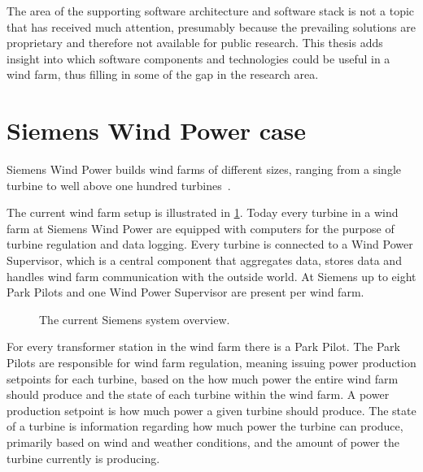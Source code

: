 The area of the supporting software architecture and software stack is not a topic that has received much attention, presumably because the prevailing solutions are proprietary and therefore not available for public research.
This thesis adds insight into which software components and technologies could be useful in a wind farm, thus filling in some of the gap in the research area.

\section{Siemens Wind Power case}


\label{sec:SiemensCase}
Siemens Wind Power builds wind farms of different sizes, ranging from a single turbine to well above one hundred turbines~\cite{simensOffShoreProjects, simensOnShoreProjects}. 

The current wind farm setup is illustrated in \cref{fig:currentSiemensSetup}. Today every turbine in a wind farm at Siemens Wind Power are equipped with computers for the purpose of turbine regulation and data logging. Every turbine is connected to a Wind Power Supervisor, which is a central component that aggregates data, stores data and handles wind farm communication with the outside world. At Siemens up to eight Park Pilots and one Wind Power Supervisor are present per wind farm.

\begin{figure}[!h]
	\centering
	\scalebox{0.7}{}
	\caption[The current Siemens wind farm system overview]{
		\label{fig:currentSiemensSetup} 
		\footnotesize{%
			The current Siemens system overview.
		}
	}
\end{figure}

For every transformer station in the wind farm there is a Park Pilot. The Park Pilots are responsible for wind farm regulation, meaning issuing power production setpoints for each turbine, based on the how much power the entire wind farm should produce and the state of each turbine within the wind farm. A power production setpoint is how much power a given turbine should produce. The state of a turbine is information regarding how much power the turbine can produce, primarily based on wind and weather conditions, and the amount of power the turbine currently is producing. 

